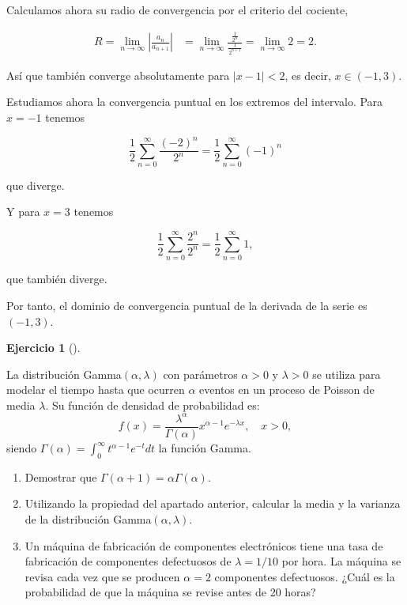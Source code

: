 \documentclass[
  spanish,
  a4paper,
]{scrreport}
\providecommand{\tightlist}{%
  \setlength{\itemsep}{0pt}\setlength{\parskip}{0pt}}
\theoremstyle{definition}
\newtheorem{exercise}{Ejercicio}[chapter]
\theoremstyle{remark}
\begin{document}
\begin{tcolorbox}
Calculamos ahora su radio de convergencia por el criterio del cociente,

\begin{align*}
R = \lim_{n\to\infty} \left|\frac{a_n}{a_{n+1}}\right|
&= \lim_{n\to\infty} \frac{\frac{1}{2^n}}{\frac{1}{2^{n+1}}} 
= \lim_{n\to\infty} 2 
= 2.
\end{align*}

Así que también converge absolutamente para \(|x-1| < 2\), es decir,
\(x \in (-1, 3)\).

Estudiamos ahora la convergencia puntual en los extremos del intervalo.
Para \(x=-1\) tenemos

\[
\frac{1}{2}\sum_{n=0}^{\infty} \frac{(-2)^n}{2^n} 
= \frac{1}{2}\sum_{n=0}^{\infty} (-1)^n 
\]

que diverge.

Y para \(x=3\) tenemos

\[
\frac{1}{2}\sum_{n=0}^{\infty} \frac{2^n}{2^n} 
= \frac{1}{2}\sum_{n=0}^{\infty} 1, 
\]

que también diverge.

Por tanto, el dominio de convergencia puntual de la derivada de la serie
es \((-1, 3)\).

\end{tcolorbox}

\begin{exercise}[]\protect\hypertarget{exr-7}{}\label{exr-7}

La distribución Gamma\((\alpha, \lambda)\) con parámetros \(\alpha>0\) y
\(\lambda>0\) se utiliza para modelar el tiempo hasta que ocurren
\(\alpha\) eventos en un proceso de Poisson de media \(\lambda\). Su
función de densidad de probabilidad es: \[
f(x) = \frac{\lambda^{\alpha}}{\Gamma(\alpha)}x^{\alpha - 1}e^{-\lambda x}, \quad x > 0,\]
siendo \(\Gamma(\alpha) = \int_0^{\infty} t^{\alpha - 1} e^{-t} dt\) la
función Gamma.

\begin{enumerate}
\def\labelenumi{\alph{enumi}.}
\tightlist
\item
  Demostrar que \(\Gamma(\alpha + 1) = \alpha \Gamma(\alpha)\).
\item
  Utilizando la propiedad del apartado anterior, calcular la media y la
  varianza de la distribución Gamma\((\alpha, \lambda)\).
\item
  Un máquina de fabricación de componentes electrónicos tiene una tasa
  de fabricación de componentes defectuosos de \(\lambda=1/10\) por
  hora. La máquina se revisa cada vez que se producen \(\alpha=2\)
  componentes defectuosos. ¿Cuál es la probabilidad de que la máquina se
  revise antes de 20 horas?
\end{enumerate}

\end{exercise}
\end{document}
